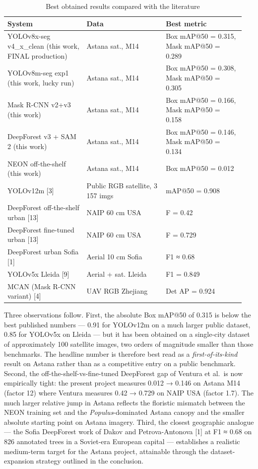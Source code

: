 \begin{longtable}[]{@{}>{\raggedright\arraybackslash}p{0.317\linewidth} >{\raggedright\arraybackslash}p{0.317\linewidth} >{\raggedright\arraybackslash}p{0.317\linewidth}@{}}
\caption{Best obtained results compared with the literature}\\
\endfirsthead

\toprule\noalign{}
\textbf{System} & \textbf{Data} & \textbf{Best metric} \\
\midrule\noalign{}
\endhead
\bottomrule\noalign{}
\endlastfoot
YOLOv8x-seg v4\_x\_clean (this work, FINAL production) & Astana sat., M14 & Box mAP@50 = 0.315, Mask mAP@50 = 0.289 \\
YOLOv8m-seg exp1 (this work, lucky run) & Astana sat., M14 & Box mAP@50 = 0.308, Mask mAP@50 = 0.305 \\
Mask R-CNN v2+v3 (this work) & Astana sat., M14 & Box mAP@50 = 0.166, Mask mAP@50 = 0.158 \\
DeepForest v3 + SAM 2 (this work) & Astana sat., M14 & Box mAP@50 = 0.146, Mask mAP@50 = 0.134 \\
NEON off-the-shelf (this work) & Astana sat., M14 & Box mAP@50 = 0.012 \\
YOLOv12m {[}3{]} & Public RGB satellite, 3 157 imgs & mAP@50 = 0.908 \\
DeepForest off-the-shelf urban {[}13{]} & NAIP 60 cm USA & F = 0.42 \\
DeepForest fine-tuned urban {[}13{]} & NAIP 60 cm USA & F = 0.729 \\
DeepForest urban Sofia {[}1{]} & Aerial 10 cm Sofia & F1 ≈ 0.68 \\
YOLOv5x Lleida {[}9{]} & Aerial + sat. Lleida & F1 = 0.849 \\
MCAN (Mask R-CNN variant) {[}4{]} & UAV RGB Zhejiang & Det AP = 0.924 \\
\end{longtable}

Three observations follow. First, the absolute Box mAP@50 of 0.315 is below the best published numbers --- 0.91 for YOLOv12m on a much larger public dataset, 0.85 for YOLOv5x on Lleida --- but it has been obtained on a single-city dataset of approximately 100 satellite images, two orders of magnitude smaller than those benchmarks. The headline number is therefore best read as a \emph{first-of-its-kind} result on Astana rather than as a competitive entry on a public benchmark. Second, the off-the-shelf-vs-fine-tuned DeepForest gap of Ventura et al.~is now empirically tight: the present project measures 0.012 → 0.146 on Astana M14 (factor 12) where Ventura measures 0.42 → 0.729 on NAIP USA (factor 1.7). The much larger relative jump in Astana reflects the floristic mismatch between the NEON training set and the \emph{Populus}-dominated Astana canopy and the smaller absolute starting point on Astana imagery. Third, the closest geographic analogue --- the Sofia DeepForest work of Dakov and Petrova-Antonova {[}1{]} at F1 ≈ 0.68 on 826 annotated trees in a Soviet-era European capital --- establishes a realistic medium-term target for the Astana project, attainable through the dataset-expansion strategy outlined in the conclusion.

